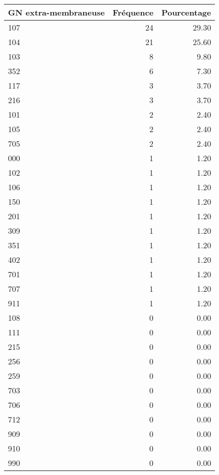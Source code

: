\documentclass[11pt,a4paper]{article}\usepackage[]{graphicx}\usepackage[]{color}
\begin{document}
\begin{table}[H]
\centering
\begin{tabular}{lrr}
  \hline
GN extra-membraneuse & Fréquence & Pourcentage \\ 
  \hline
107 &  24 & 29.30 \\ 
  104 &  21 & 25.60 \\ 
  103 &   8 & 9.80 \\ 
  352 &   6 & 7.30 \\ 
  117 &   3 & 3.70 \\ 
  216 &   3 & 3.70 \\ 
  101 &   2 & 2.40 \\ 
  105 &   2 & 2.40 \\ 
  705 &   2 & 2.40 \\ 
  000 &   1 & 1.20 \\ 
  102 &   1 & 1.20 \\ 
  106 &   1 & 1.20 \\ 
  150 &   1 & 1.20 \\ 
  201 &   1 & 1.20 \\ 
  309 &   1 & 1.20 \\ 
  351 &   1 & 1.20 \\ 
  402 &   1 & 1.20 \\ 
  701 &   1 & 1.20 \\ 
  707 &   1 & 1.20 \\ 
  911 &   1 & 1.20 \\ 
  108 &   0 & 0.00 \\ 
  111 &   0 & 0.00 \\ 
  215 &   0 & 0.00 \\ 
  256 &   0 & 0.00 \\ 
  259 &   0 & 0.00 \\ 
  703 &   0 & 0.00 \\ 
  706 &   0 & 0.00 \\ 
  712 &   0 & 0.00 \\ 
  909 &   0 & 0.00 \\ 
  910 &   0 & 0.00 \\ 
  990 &   0 & 0.00 \\ 
   \hline
\end{tabular}
\end{table}
\end{document}
